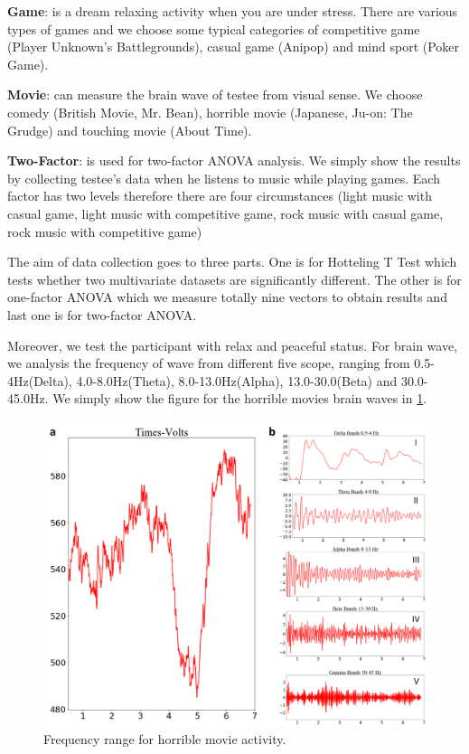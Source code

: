 \documentclass[letterpaper,twocolumn,10pt]{article}
\begin{document}
\noindent
{}
\setlength{\hangindent}{1em}
\textbf{Game}: is a dream relaxing activity when you are under stress. There are various types of games and we choose some typical categories of competitive game (Player Unknown’s Battlegrounds), casual game (Anipop) and mind sport (Poker Game).

\noindent
{}
\setlength{\hangindent}{1em}
\textbf{Movie}: can measure the brain wave of testee from visual sense. We choose comedy (British Movie, Mr. Bean), horrible movie (Japanese, Ju-on: The Grudge) and touching movie (About Time).

\noindent
{}
\setlength{\hangindent}{1em}
\textbf{Two-Factor}: is used for two-factor ANOVA analysis. We simply show the results by collecting testee's data when he listens to music while playing games. Each factor has two levels therefore there are four circumstances (light music with casual game, light music with competitive game, rock music with casual game, rock music with competitive game)

The aim of data collection goes to three parts. One is for Hotteling T Test which tests whether two multivariate datasets are significantly different. The other is for one-factor ANOVA which we measure totally nine vectors to obtain results and last one is for two-factor ANOVA.

Moreover, we test the participant with relax and peaceful status. For brain wave, we analysis the frequency of wave from different five scope, ranging from 0.5-4Hz(Delta), 4.0-8.0Hz(Theta), 8.0-13.0Hz(Alpha), 13.0-30.0(Beta) and 30.0-45.0Hz. We simply show the figure for the horrible movies brain waves in \ref{fig:waves}.

\begin{figure}[h!]
  \centering
  \includegraphics[width=0.8\linewidth]{fig/waves}
  \caption{Frequency range for horrible movie activity.}
  \label{fig:waves}
\end{figure}
\end{document}
